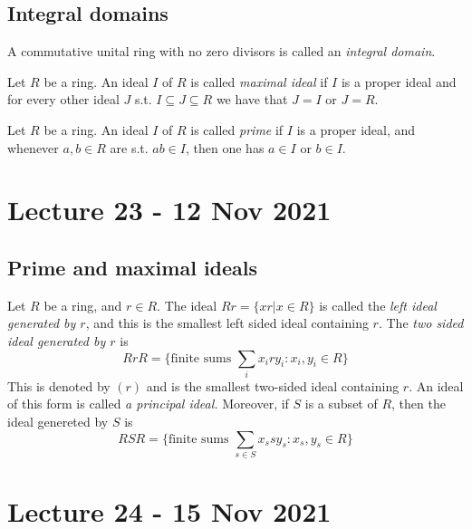 \documentclass[11pt]{scrartcl}
\begin{document}
\subsection{Integral domains}

\begin{definition}
  A commutative unital ring with no zero divisors is called an \emph{integral domain}.
  \label{def:integralDomain}
\end{definition}

\begin{definition}
  Let $R$ be a ring. An ideal $I$ of $R$ is called \emph{maximal ideal} if $I$ is a proper
  ideal and for every other ideal $J$ s.t. $I\subseteq J \subseteq R$ we have that $J=I$
  or $J=R$.
  \label{def:maximalIdeal}
\end{definition}

\begin{definition}
  Let $R$ be a ring. An ideal $I$ of $R$ is called \emph{prime} if $I$ is a proper ideal,
  and whenever $a,b\in R$ are s.t. $ab\in I$, then one has $a\in I$ or $b\in I$.
  \label{<+label+>}
\end{definition}

\section{Lecture 23 - 12 Nov 2021}

\subsection{Prime and maximal ideals}

\begin{definition}
  Let $R$ be a ring, and $r\in R$. The ideal $Rr=\{xr | x\in R\}$ is called the \emph{left
  ideal generated by $r$}, and this is the smallest left sided ideal containing $r$. The
  \emph{two sided ideal generated by $r$} is
  \[RrR= \{\text{finite sums }\sum_i x_i r y_i : x_i,y_i\in R\}\]
  This is denoted by $(r)$ and is the smallest two-sided ideal containing $r$. An ideal of
  this form is called \emph{a principal ideal.} Moreover, if $S$ is a subset of $R$, then
  the ideal genereted by $S$ is
  \[RSR = \{\text{finite sums }\sum_{s\in S} x_s s y_s : x_s,y_s\in R \}\]

  \label{<+label+>}
\end{definition}

\section{Lecture 24 - 15 Nov 2021}
\end{document}
